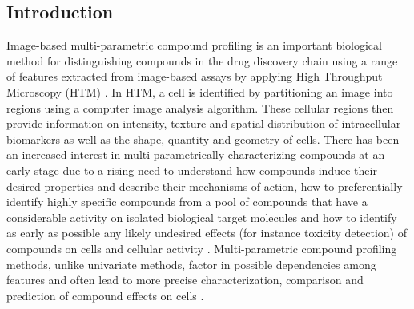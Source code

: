 \documentclass[11pt]{article}
\begin{document}
\subsection{Introduction} \label{intro}
\par{Image-based multi-parametric compound profiling is an important biological method for distinguishing compounds in the drug discovery chain using a range of features extracted from image-based assays by applying High Throughput Microscopy (HTM) \cite{Price2002, Lin2007,Reisen2015}. In HTM, a cell is identified by partitioning an image into regions using a computer image analysis algorithm. These cellular regions then provide information on intensity, texture and spatial distribution of intracellular biomarkers as well as the shape, quantity and geometry of cells. There has been an increased interest in multi-parametrically characterizing compounds at an early stage due to a rising need to understand how compounds induce their desired properties and describe their mechanisms of action, how to preferentially identify highly specific compounds from a pool of compounds that have a considerable activity on isolated biological target molecules and how to identify as early as possible any likely undesired effects (for instance toxicity detection) of compounds on cells and cellular activity \cite{Lang2006,Reisen2015,Perlman2004}. Multi-parametric  compound profiling methods, unlike univariate methods, factor in possible dependencies among features and often lead to more precise characterization, comparison and prediction of compound effects on cells \cite{Loo2007, Laufer2013}.}
\end{document}
